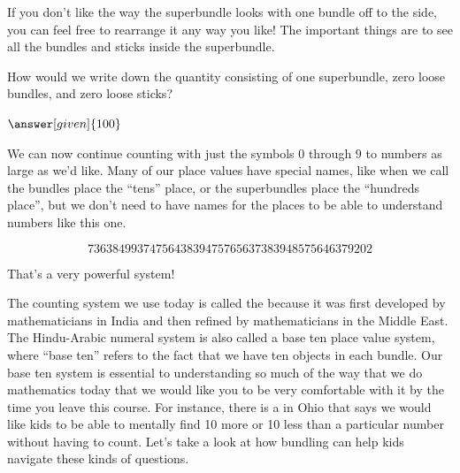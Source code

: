 \documentclass{ximera}
\begin{document}
If you don't like the way the superbundle looks with one bundle off to the side, you can feel free to rearrange it any way you like! The important things are to see all the bundles and sticks inside the superbundle.


\begin{image}
\end{image}

\begin{question}
How would we write down the quantity consisting of one superbundle, zero loose bundles, and zero loose sticks?

\begin{prompt}
	$\answer[given]{100}$
\end{prompt}
\end{question}

We can now continue counting with just the symbols $0$ through $9$ to numbers as large as we'd like. Many of our place values have special names, like when we call the bundles place the ``tens'' place, or the superbundles place the ``hundreds place'', but we don't need to have names for the places to be able to understand numbers like this one.

\[
7363849937475643839475765637383948575646379202
\]

That's a very powerful system!

The counting system we use today is called the  because it was first developed by mathematicians in India and then refined by mathematicians in the Middle East. The Hindu-Arabic numeral system is also called a base ten place value system, where ``base ten'' refers to the fact that we have ten objects in each bundle. Our base ten system is essential to understanding so much of the way that we do mathematics today that we would like you to be very comfortable with it by the time you leave this course. For instance, there is a  in Ohio that says we would like kids to be able to mentally find 10 more or 10 less than a particular number without having to count. Let's take a look at how bundling can help kids navigate these kinds of questions.
\end{document}
